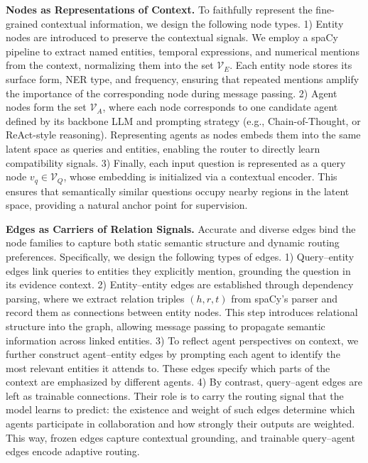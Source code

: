 \documentclass[11pt]{article}
\begin{document}
\noindent\textbf{Nodes as Representations of Context. }  
To faithfully represent the fine-grained contextual information, we design the following node types. 1) Entity nodes are introduced to preserve the contextual signals. We employ a spaCy pipeline to extract named entities, temporal expressions, and numerical mentions from the context, normalizing them into the set $\mathcal{V}_E$. Each entity node stores its surface form, NER type, and frequency, ensuring that repeated mentions amplify the importance of the corresponding node during message passing. 2) Agent nodes form the set $\mathcal{V}_A$, where each node corresponds to one candidate agent defined by its backbone LLM and prompting strategy (e.g., Chain-of-Thought, or ReAct-style reasoning). Representing agents as nodes embeds them into the same latent space as queries and entities, enabling the router to directly learn compatibility signals. 3) Finally, each input question is represented as a query node $v_q \in \mathcal{V}_Q$, whose embedding is initialized via a contextual encoder. This ensures that semantically similar questions occupy nearby regions in the latent space, providing a natural anchor point for supervision.

\noindent\textbf{Edges as Carriers of Relation Signals.}   
Accurate and diverse edges bind the node families to capture both static semantic structure and dynamic routing preferences. Specifically, we design the following types of edges. 1) Query–entity edges link queries to entities they explicitly mention, grounding the question in its evidence context. 2) Entity–entity edges are established through dependency parsing, where we extract relation triples $(h,r,t)$ from spaCy’s parser and record them as connections between entity nodes. This step introduces relational structure into the graph, allowing message passing to propagate semantic information across linked entities. 3) To reflect agent perspectives on context, we further construct agent–entity edges by prompting each agent to identify the most relevant entities it attends to. These edges specify which parts of the context are emphasized by different agents. 4) By contrast, query–agent edges are left as trainable connections. Their role is to carry the routing signal that the model learns to predict: the existence and weight of such edges determine which agents participate in collaboration and how strongly their outputs are weighted. This way, frozen edges capture contextual grounding, and trainable query–agent edges encode adaptive routing.
\end{document}
